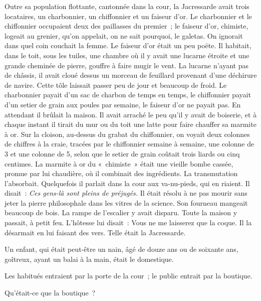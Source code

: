 \documentclass[french,twoside]{book} %
\begin{document}
Outre sa population flottante, cantonnée dans la cour, la Jacressarde avait trois locataires, un charbonnier, un chiffonnier et un faiseur d’or. Le charbonnier et le chiffonnier occupaient deux des paillasses du premier ; le faiseur d’or, chimiste, logeait au grenier, qu’on appelait, on ne sait pourquoi, le galetas. On ignorait dans quel coin couchait la femme. Le faiseur d’or était un peu poëte. Il habitait, dans le toit, sous les tuiles, une chambre où il y avait une lucarne  étroite et une grande cheminée de pierre, gouffre à faire mugir le vent. La lucarne n’ayant pas de châssis, il avait cloué dessus un morceau de feuillard provenant d’une déchirure de navire. Cette tôle laissait passer peu de jour et beaucoup de froid. Le charbonnier payait d’un sac de charbon de temps en temps, le chiffonnier payait d’un setier de grain aux poules par semaine, le faiseur d’or ne payait pas. En attendant il brûlait la maison. Il avait arraché le peu qu’il y avait de boiserie, et à chaque instant il tirait du mur ou du toit une latte pour faire chauffer sa marmite à or. Sur la cloison, au-dessus du grabat du chiffonnier, on voyait deux colonnes de chiffres à la craie, tracées par le chiffonnier semaine à semaine, une colonne de 3 et une colonne de 5, selon que le setier de grain coûtait trois liards ou cinq centimes. La marmite à or du « chimiste » était une vieille bombe cassée, promue par lui chaudière, où il combinait des ingrédients. La transmutation l’absorbait. Quelquefois il parlait dans la cour aux va-nu-pieds, qui en riaient. Il disait : \emph{Ces gens-là sont pleins de préjugés.} Il était résolu à ne pas mourir sans jeter la pierre philosophale dans les vitres de la science. Son fourneau mangeait beaucoup de bois. La rampe de l’escalier y avait disparu. Toute la maison y passait, à petit feu. L’hôtesse lui disait : Vous ne me laisserez que la coque. Il la désarmait en lui faisant des vers. Telle était la Jacressarde.\par
Un enfant, qui était peut-être un nain, âgé de douze ans ou de soixante ans, goîtreux, ayant un balai à la main, était le domestique.\par
 Les habitués entraient par la porte de la cour ; le public entrait par la boutique.\par
Qu’était-ce que la boutique ?\par
\end{document}
